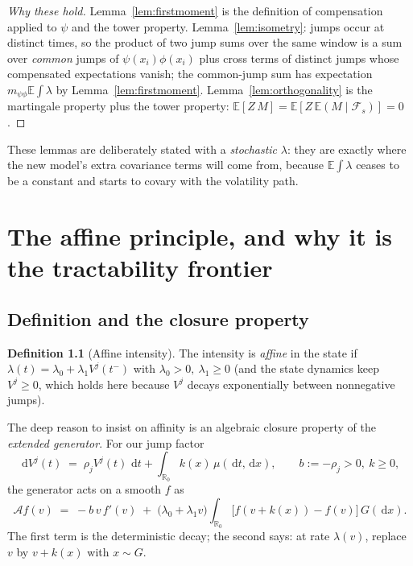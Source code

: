 \documentclass[11pt]{report}
\theoremstyle{definition}
\newtheorem{definition}[theorem]{Definition}
\theoremstyle{remark}
\newcommand{\E}{\mathbb{E}}
\newcommand{\R}{\mathbb{R}}
\newcommand{\F}{\mathcal{F}}
\newcommand{\A}{\mathcal{A}}
\newcommand{\dd}{\,\mathrm{d}}
\newcommand{\Vj}{V^{j}}
\begin{document}
\begin{proof}[Why these hold]
Lemma~\ref{lem:firstmoment} is the definition of compensation applied to
$\psi$ and the tower property. Lemma~\ref{lem:isometry}: jumps occur at
distinct times, so the product of two jump sums over the same window is a sum
over \emph{common} jumps of $\psi(x_i)\phi(x_i)$ plus cross terms of distinct
jumps whose compensated expectations vanish; the common-jump sum has
expectation $m_{\psi\phi}\E\int\lambda$ by Lemma~\ref{lem:firstmoment}.
Lemma~\ref{lem:orthogonality} is the martingale property plus the tower
property: $\E[Z\,M]=\E[Z\,\E(M\mid\F_{s})]=0$.
\end{proof}

These lemmas are deliberately stated with a \emph{stochastic} $\lambda$: they
are exactly where the new model's extra covariance terms will come from,
because $\E\int\lambda$ ceases to be a constant and starts to covary with the
volatility path.

\chapter{The affine principle, and why it is the tractability frontier}
\label{ch:affine}

\section{Definition and the closure property}

\begin{definition}[Affine intensity]
The intensity is \emph{affine} in the state if
$\lambda(t)=\lambda_{0}+\lambda_{1}\Vj(t^{-})$ with $\lambda_{0}>0,\
\lambda_{1}\ge0$ (and the state dynamics keep $\Vj\ge0$, which holds here
because $\Vj$ decays exponentially between nonnegative jumps).
\end{definition}

The deep reason to insist on affinity is an algebraic closure property of the
\emph{extended generator}. For our jump factor
\[
\dd \Vj(t) \;=\; \rho_{j}\Vj(t)\,\dd t + \int_{\R_0} k(x)\,\mu(\dd t,\dd x),
\qquad b:=-\rho_{j}>0,\ k\ge 0,
\]
the generator acts on a smooth $f$ as
\begin{equation}\label{eq:generator}
\A f(v) \;=\; -b\,v\,f'(v)
\;+\;\big(\lambda_{0}+\lambda_{1}v\big)\int_{\R_0}\big[f(v+k(x))-f(v)\big]\,G(\dd x).
\end{equation}
The first term is the deterministic decay; the second says: at rate
$\lambda(v)$, replace $v$ by $v+k(x)$ with $x\sim G$.
\end{document}

